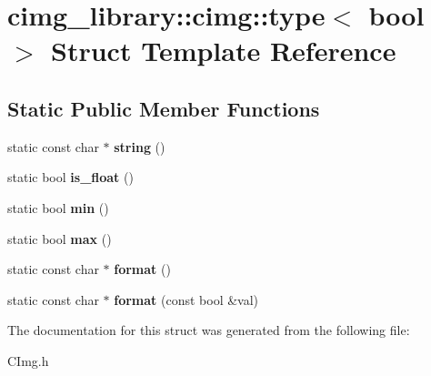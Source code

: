 \hypertarget{structcimg__library_1_1cimg_1_1type_3_01bool_01_4}{\section{cimg\-\_\-library\-:\-:cimg\-:\-:type$<$ bool $>$ Struct Template Reference}
\label{structcimg__library_1_1cimg_1_1type_3_01bool_01_4}
}
\subsection*{Static Public Member Functions}
\begin{DoxyCompactItemize}
\item 
\hypertarget{structcimg__library_1_1cimg_1_1type_3_01bool_01_4_a95756bd346a24a5fe3856dd2e0b9515a}{static const char $\ast$ {\bfseries string} ()}\label{structcimg__library_1_1cimg_1_1type_3_01bool_01_4_a95756bd346a24a5fe3856dd2e0b9515a}

\item 
\hypertarget{structcimg__library_1_1cimg_1_1type_3_01bool_01_4_ab3d853560f99ade46f2b4f77edf3a395}{static bool {\bfseries is\-\_\-float} ()}\label{structcimg__library_1_1cimg_1_1type_3_01bool_01_4_ab3d853560f99ade46f2b4f77edf3a395}

\item 
\hypertarget{structcimg__library_1_1cimg_1_1type_3_01bool_01_4_a819c8824c5bfc7b1383fcefd0e682dad}{static bool {\bfseries min} ()}\label{structcimg__library_1_1cimg_1_1type_3_01bool_01_4_a819c8824c5bfc7b1383fcefd0e682dad}

\item 
\hypertarget{structcimg__library_1_1cimg_1_1type_3_01bool_01_4_a989dafa9caa7599f4ebe07dfa2d65d42}{static bool {\bfseries max} ()}\label{structcimg__library_1_1cimg_1_1type_3_01bool_01_4_a989dafa9caa7599f4ebe07dfa2d65d42}

\item 
\hypertarget{structcimg__library_1_1cimg_1_1type_3_01bool_01_4_a4e869a2afa577783adbe012f850973bb}{static const char $\ast$ {\bfseries format} ()}\label{structcimg__library_1_1cimg_1_1type_3_01bool_01_4_a4e869a2afa577783adbe012f850973bb}

\item 
\hypertarget{structcimg__library_1_1cimg_1_1type_3_01bool_01_4_a0cbaad15f25c2d5184b0a610bbb918b8}{static const char $\ast$ {\bfseries format} (const bool \&val)}\label{structcimg__library_1_1cimg_1_1type_3_01bool_01_4_a0cbaad15f25c2d5184b0a610bbb918b8}

\end{DoxyCompactItemize}


The documentation for this struct was generated from the following file\-:\begin{DoxyCompactItemize}
\item 
C\-Img.\-h\end{DoxyCompactItemize}
